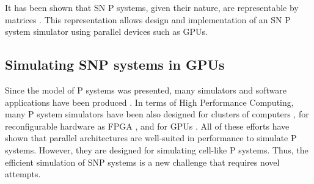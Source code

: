 \documentclass{svmultm}
\newcommand{\redmark}[1]{\color{red} #1 \color{black}}
\begin{document}
It has been shown that SN P systems, given their nature, are representable by matrices \cite{snpbrain}\cite{snpmat}. This representation allows design and implementation of an SN P system simulator using parallel devices such as GPUs. 


\subsection{Simulating SNP systems in  {GPUs}}

\redmark{
Since the model of P systems was presented, many simulators and software applications have been produced \cite{swhandbook}. In terms of High Performance Computing, many P system simulators have been also designed for clusters of computers \cite{CiWe04}, for reconfigurable hardware as FPGA \cite{nguyen}, and for GPUs \cite{amgpu,satgpu}. All of these efforts have shown that parallel architectures are well-suited in performance to simulate P systems. However, they are designed for simulating cell-like P systems. Thus, the efficient simulation of SNP systems is a new challenge that requires novel attempts.
}
\end{document}
